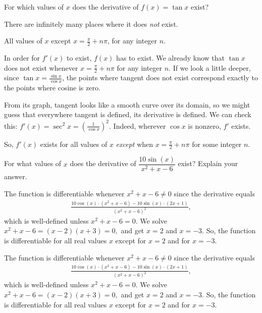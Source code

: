 \begin{question}[2015Q]
For which values of $x$ does the derivative of $f(x) = \tan x$ exist?
\end{question}
\begin{hint}
There are infinitely many places where it does \emph{not} exist.
\end{hint}
\begin{answer}
All values of $x$ except $x=\frac{\pi}{2}+n\pi$, for any integer $n$.
\end{answer}
\begin{solution}
In order for $f'(x)$ to exist, $f(x)$ has to exist. We already know that $\tan x $ does not exist whenever $x=\frac{\pi}{2}+n\pi$ for any integer $n$. If we look a little deeper, since $\tan x = \frac{\sin x}{\cos x}$, the points where tangent does not exist correspond exactly to the points where cosine is zero.

From its graph, tangent looks like a smooth curve over its domain, so we might guess that everywhere tangent is defined, its derivative is defined. We can check this: $f'(x) = \sec^2 x = \left(\frac{1}{\cos x}\right)^2$. Indeed, wherever $\cos x$ is nonzero, $f'$ exists.

So, $f'(x)$ exists for all values of $x$ \emph{except} when $x=\frac{\pi}{2}+n\pi$ for some integer $n$.
\end{solution}


\begin{Mquestion}[2015Q]
For what values of $x$ does the derivative of
$\dfrac{10\sin(x)}{x^2+x-6}$ exist? Explain your answer.
\end{Mquestion}
\begin{answer}
The function is differentiable whenever $x^2+x-6\ne 0$ since the derivative equals
\begin{align*}
\frac{10\cos(x)\cdot (x^2+x-6)-10\sin(x)\cdot (2x+1)}{(x^2+x-6)^2},
\end{align*}
which is well-defined unless $x^2+x-6=0$. We solve $x^2+x-6=(x-2)(x+3)=0,$
and get $x=2$ and $x=-3$. So, the function is differentiable for all real values $x$ except for $x=2$ and for $x=-3$.
\end{answer}
\begin{solution}
The function is differentiable whenever $x^2+x-6\ne 0$ since the derivative equals
\begin{align*}
\frac{10\cos(x)\cdot (x^2+x-6)-10\sin(x)\cdot (2x+1)}{(x^2+x-6)^2},
\end{align*}
which is well-defined unless $x^2+x-6=0$. We solve $x^2+x-6=(x-2)(x+3)=0,$
and get $x=2$ and $x=-3$. So, the function is differentiable for all real values $x$ except for $x=2$ and for $x=-3$.
\end{solution}



